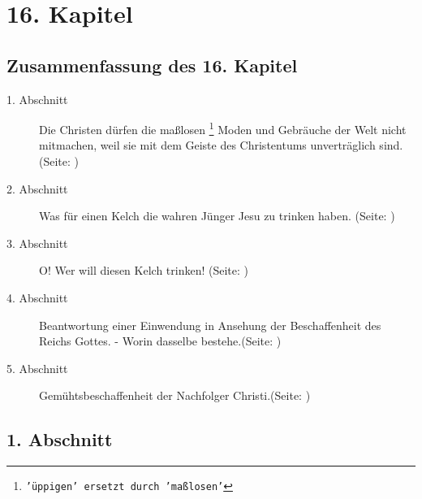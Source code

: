 

\chapter{16. Kapitel} \label{kap16}
\section{Zusammenfassung des 16. Kapitel}
\small
\begin{description}
\item[1. Abschnitt] Die Christen dürfen die maßlosen
\footnote{\texttt{'üppigen' ersetzt durch 'maßlosen'}}
Moden und Gebräuche der Welt
nicht mitmachen, weil sie mit dem Geiste des Christentums unverträglich sind. (Seite: \pageref{kap16_ab1})
\item[2. Abschnitt] Was für einen Kelch die wahren Jünger Jesu zu trinken haben. (Seite: \pageref{kap16_ab2})
\item[3. Abschnitt] O! Wer will diesen Kelch trinken! (Seite: \pageref{kap16_ab3})
\item[4. Abschnitt] Beantwortung einer Einwendung in Ansehung der Beschaffenheit
des Reichs Gottes. - Worin dasselbe bestehe.(Seite: \pageref{kap16_ab4})
\item[5. Abschnitt] Gemühtsbeschaffenheit der Nachfolger Christi.(Seite: \pageref{kap16_ab5})

\end{description}
\normalsize

\section{1. Abschnitt} \label{kap16_ab1}

